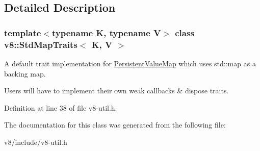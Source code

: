 \subsection{Detailed Description}
\subsubsection*{template$<$typename K, typename V$>$\newline
class v8\+::\+Std\+Map\+Traits$<$ K, V $>$}

A default trait implementation for \mbox{\hyperlink{classv8_1_1PersistentValueMap}{Persistent\+Value\+Map}} which uses std\+::map as a backing map.

Users will have to implement their own weak callbacks \& dispose traits. 

Definition at line 38 of file v8-\/util.\+h.



The documentation for this class was generated from the following file\+:\begin{DoxyCompactItemize}
\item 
v8/include/v8-\/util.\+h\end{DoxyCompactItemize}
